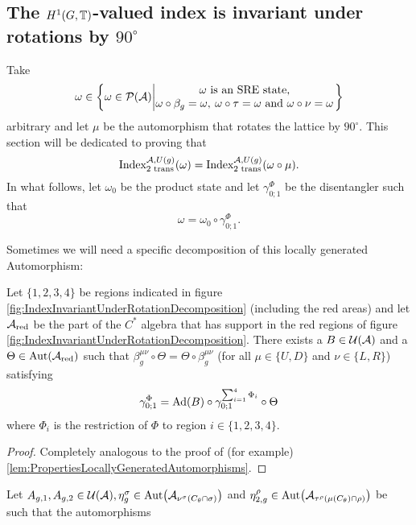 \documentclass[11pt,a4paper,twoside]{article}
\numberwithin{equation}{section}
\begin{document}
\subsection{The $H^1(G,\TT)$-valued index is invariant under rotations by $90^\circ$}\label{sec:H1ValuedIndexInvariantUnderRotations}
Take
\begin{equation}
	\omega\in\left\{\omega\in\PP(\AA)\left| \begin{matrix}\omega\text{ is an SRE state,}\\\omega\circ\beta_g=\omega,\:\omega\circ\tau=\omega\text{ and }\omega\circ\nu=\omega\end{matrix} \right.\right\}
\end{equation}
arbitrary and let $\mu$ be the automorphism that rotates the lattice by $90^\circ$. This section will be dedicated to proving that
\begin{equation}
	\textrm{Index}_{\text{2 trans}}^{\AA,U(g)}(\omega)=\textrm{Index}_{\text{2 trans}}^{\AA,U(g)}(\omega\circ\mu).
\end{equation}
In what follows, let $\omega_0$ be the product state and let $\gamma^\Phi_{0;1}$ be the disentangler such that
\begin{equation}
	\omega=\omega_0\circ\gamma^\Phi_{0;1}.
\end{equation}

Sometimes we will need a specific decomposition of this locally generated Automorphism:
\begin{lemma}\label{lem:DecompositionOfLGAInCross}
	Let $\{1,2,3,4\}$ be regions indicated in figure \ref{fig:IndexInvariantUnderRotationDecomposition} (including the red areas) and let $\AA_{\text{red}}$ be the part of the $C^*$ algebra that has support in the red regions of figure \ref{fig:IndexInvariantUnderRotationDecomposition}. There exists a $B\in\UU(\AA)$ and a $\Theta\in\Aut{\AA_{\text{red}}}$ such that $\beta^{\mu\nu}_g\circ\Theta=\Theta\circ\beta^{\mu\nu}_g$ (for all $\mu\in\{U,D\}$ and $\nu\in\{L,R\}$) satisfying
	\begin{equation}
		\gamma^\Phi_{0;1}=\Ad{B}\circ\gamma^{\sum_{i=1}^4\Phi_i}_{0;1}\circ\Theta
	\end{equation}
	where $\Phi_i$ is the restriction of $\Phi$ to region $i\in\{1,2,3,4\}$.
\end{lemma}
\begin{proof}
	Completely analogous to the proof of (for example) \ref{lem:PropertiesLocallyGeneratedAutomorphisms}.
\end{proof}
Let $A_{g,1},A_{g,2}\in\UU(\AA),\eta^\sigma_g\in\Aut{\AA_{\nu^{\sigma}(C_\theta\cap\sigma)}}$ and $\eta^\rho_{2,g}\in\Aut{\AA_{\tau^{\rho}(\mu(C_\theta)\cap\rho)}}$ be such that the automorphisms
\end{document}

